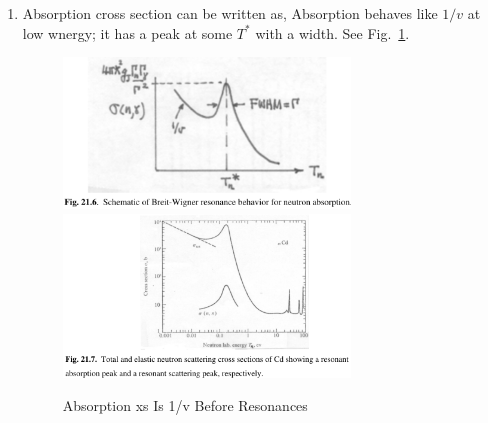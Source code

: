 \documentclass{school-22.101-notes}
\begin{document}
\begin{enumerate}
\item Absorption cross section can be written as, 
Absorption behaves like $1/v$ at low wnergy; it has a peak at some $T^*$ with a width. See Fig.~\ref{2167}. 
  \begin{figure}
    \centering
    \includegraphics[width=3in]{images/ni/21.6.png}
    \includegraphics[width=3in]{images/ni/21.7.png}
    \caption{Absorption xs Is 1/v Before Resonances}  \label{2167}
  \end{figure}


\end{enumerate}
\end{document}
